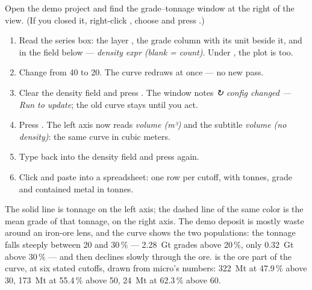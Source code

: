\begin{tryit}
Open the demo project and find the grade–tonnage window at the right of the view. (If you closed it, right-click , choose  and press .)
\begin{enumerate}
\item Read the series box: the layer , the grade column  with its unit \ui{\%} beside it, and  in the field below — \emph{density expr (blank = count)}. Under , the plot  is \ui{\%} too.
\item Change  from 40 to 20. The curve redraws at once — no new pass.
\item Clear the density field and press . The window notes \emph{↻ config changed — Run to update}; the old curve stays until you act.
\item Press . The left axis now reads \emph{volume (m³)} and the subtitle \emph{volume (no density)}: the same curve in cubic meters.
\item Type  back into the density field and press  again.
\item Click  and paste into a spreadsheet: one row per cutoff, with tonnes, grade and contained metal in tonnes.
\end{enumerate}
\end{tryit}


The solid line is tonnage on the left axis; the dashed line of the same color is the mean grade of that tonnage, on the right axis. The demo deposit is mostly waste around an iron-ore lens, and the curve shows the two populations: the tonnage falls steeply between 20 and 30\,\% — 2.28~Gt grades above 20\,\%, only 0.32~Gt above 30\,\% — and then declines slowly through the ore.  is the ore part of the curve, at six stated cutoffs, drawn from micro's numbers: 322~Mt at 47.9\,\% above 30, 173~Mt at 55.4\,\% above 50, 24~Mt at 62.3\,\% above 60.


